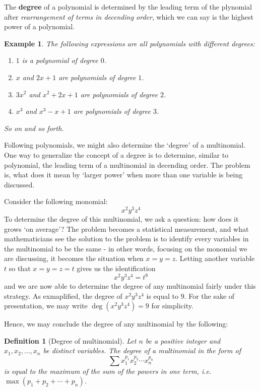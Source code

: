 \documentclass[12pt]{article}
\newtheorem{definition}{Definition}[section]
\newtheorem*{example}{Example}
\begin{document}
    The \textbf{degree} of a polynomial is determined by the leading term of the plynomial after \textit{rearrangement of terms in decending order}, which we can say is the highest power of a polynomial.

    \begin{example}
        The following expressions are all polynomials with different degrees:
        \begin{enumerate}
            \item $1$ is a polynomial of degree $0$.
            \item $x$ and $2x+1$ are polynomials of degree $1$.
            \item $3x^2$ and $x^2+2x+1$ are polynomials of degree $2$.
            \item $x^3$ and $x^3-x+1$ are polynomials of degree $3$.
        \end{enumerate}
        So on and so forth.
    \end{example}

    Following polynomials, we might also determine the `degree' of a multinomial. One way to generalize the concept of a degree is to determine, similar to polynomial, the leading term of a multinomial in decending order. The problem is, what does it mean by `larger power' when more than one variable is being discussed.

    Consider the following monomial: \[x^2 y^3 z^4\]
    To determine the degree of this multinomial, we ask a question: how does it grows `on average'? The problem becomes a statistical measurement, and what mathematicians see the solution to the problem is to identify every variables in the multinomial to be the same - in other words, focusing on the monomial we are discussing, it becomes the situation when $x=y=z$. Letting another variable $t$ so that $x=y=z=t$ gives us the identification \[x^2 y^3 z^4 = t^9\] and we are now able to determine the degree of any multinomial fairly under this strategy. As exmaplified, the degree of $x^2 y^3 z^4$ is equal to $9$. For the sake of presentation, we may write $\deg(x^2 y^3 z^4)=9$ for simplicity.

    Hence, we may conclude the degree of any multinomial by the following:

    \begin{definition}[Degree of multinomial]
        Let $n$ be a positive integer and $x_1,x_2,\dots,x_n$ be distinct variables. The degree of a multinomial in the form of \[\sum x_1^{p_1} x_2^{p_2}\cdots x_n^{p_n}\] is equal to the maximum of the sum of the powers in one term, i.e. $\max(p_1+p_2+\cdots+p_n)$.
    \end{definition}
\end{document}
